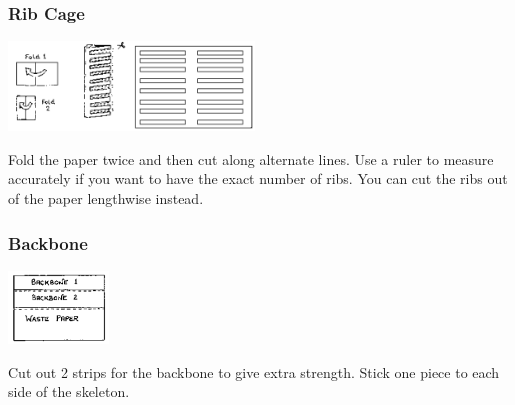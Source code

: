 \begin{multicols}{2}
\subsubsection{Rib Cage}

\begin{center}
\includegraphics[width=0.49\textwidth]{./img/source/skeleton-ribs.png}
\end{center}
Fold the paper twice and then cut along alternate lines. Use a ruler to
measure accurately if you want to have the exact number of ribs. You
can cut the ribs out of the paper lengthwise instead.

\subsubsection{Backbone}

\begin{center}
\includegraphics[width=0.2\textwidth]{./img/source/skeleton-backbone.png}
\end{center}
Cut out 2 strips for the backbone
to give extra strength. Stick one
piece to each side of the skeleton.


\end{multicols}
